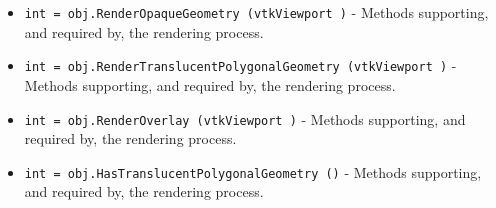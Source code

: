 \begin{itemize}
\item  \verb|int = obj.RenderOpaqueGeometry (vtkViewport )| -  Methods supporting, and required by, the rendering process.

\item  \verb|int = obj.RenderTranslucentPolygonalGeometry (vtkViewport )| -  Methods supporting, and required by, the rendering process.

\item  \verb|int = obj.RenderOverlay (vtkViewport )| -  Methods supporting, and required by, the rendering process.

\item  \verb|int = obj.HasTranslucentPolygonalGeometry ()| -  Methods supporting, and required by, the rendering process.

\end{itemize}
